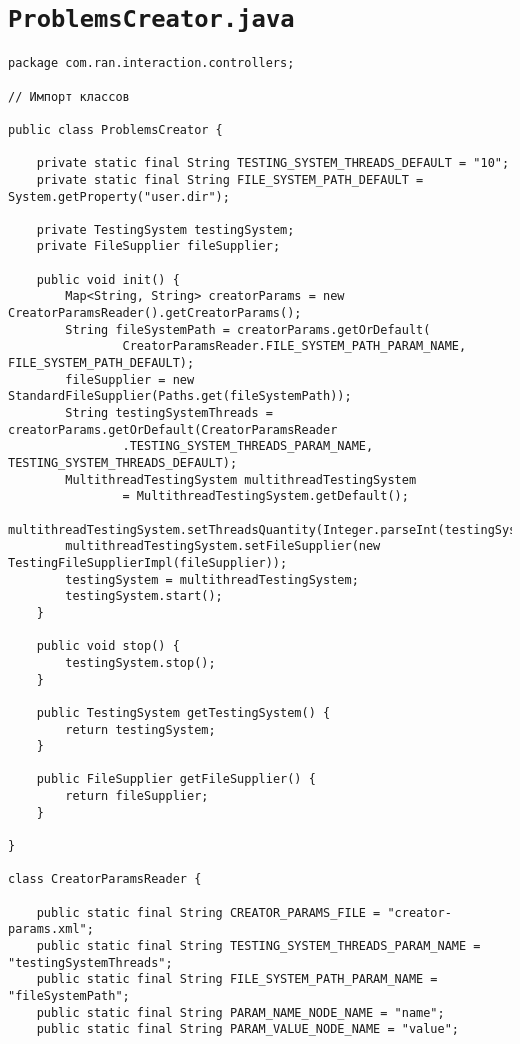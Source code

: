 \section*{\texttt{ProblemsCreator.java}}
\begin{verbatim}
package com.ran.interaction.controllers;

// Импорт классов

public class ProblemsCreator {

    private static final String TESTING_SYSTEM_THREADS_DEFAULT = "10";
    private static final String FILE_SYSTEM_PATH_DEFAULT = System.getProperty("user.dir");

    private TestingSystem testingSystem;
    private FileSupplier fileSupplier;

    public void init() {
        Map<String, String> creatorParams = new CreatorParamsReader().getCreatorParams();
        String fileSystemPath = creatorParams.getOrDefault(
                CreatorParamsReader.FILE_SYSTEM_PATH_PARAM_NAME, FILE_SYSTEM_PATH_DEFAULT);
        fileSupplier = new StandardFileSupplier(Paths.get(fileSystemPath));
        String testingSystemThreads = creatorParams.getOrDefault(CreatorParamsReader
                .TESTING_SYSTEM_THREADS_PARAM_NAME, TESTING_SYSTEM_THREADS_DEFAULT);
        MultithreadTestingSystem multithreadTestingSystem
                = MultithreadTestingSystem.getDefault();
        multithreadTestingSystem.setThreadsQuantity(Integer.parseInt(testingSystemThreads));
        multithreadTestingSystem.setFileSupplier(new TestingFileSupplierImpl(fileSupplier));
        testingSystem = multithreadTestingSystem;
        testingSystem.start();
    }

    public void stop() {
        testingSystem.stop();
    }

    public TestingSystem getTestingSystem() {
        return testingSystem;
    }

    public FileSupplier getFileSupplier() {
        return fileSupplier;
    }

}

class CreatorParamsReader {

    public static final String CREATOR_PARAMS_FILE = "creator-params.xml";
    public static final String TESTING_SYSTEM_THREADS_PARAM_NAME = "testingSystemThreads";
    public static final String FILE_SYSTEM_PATH_PARAM_NAME = "fileSystemPath";
    public static final String PARAM_NAME_NODE_NAME = "name";
    public static final String PARAM_VALUE_NODE_NAME = "value";


\end{verbatim}
